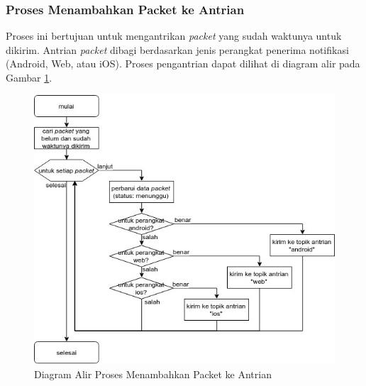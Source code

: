 \subsubsection{Proses Menambahkan Packet ke Antrian}
\label{3:proses_menambahkan_packet_ke_antrian}
\par Proses ini bertujuan untuk mengantrikan \textit{packet} yang sudah waktunya untuk dikirim.
Antrian \textit{packet} dibagi berdasarkan jenis perangkat penerima notifikasi (Android, Web, atau iOS). Proses pengantrian dapat dilihat di diagram alir pada Gambar \ref{flowchart_menambahkan_packet_ke_antrian}.
\begin{figure}[H]
	\centering\includegraphics[width=1\textwidth]{bab3/img/flowchart-menambahkan_packet_ke_antrian.jpg}
	\caption{Diagram Alir Proses Menambahkan Packet ke Antrian} \label{flowchart_menambahkan_packet_ke_antrian}
\end{figure}

